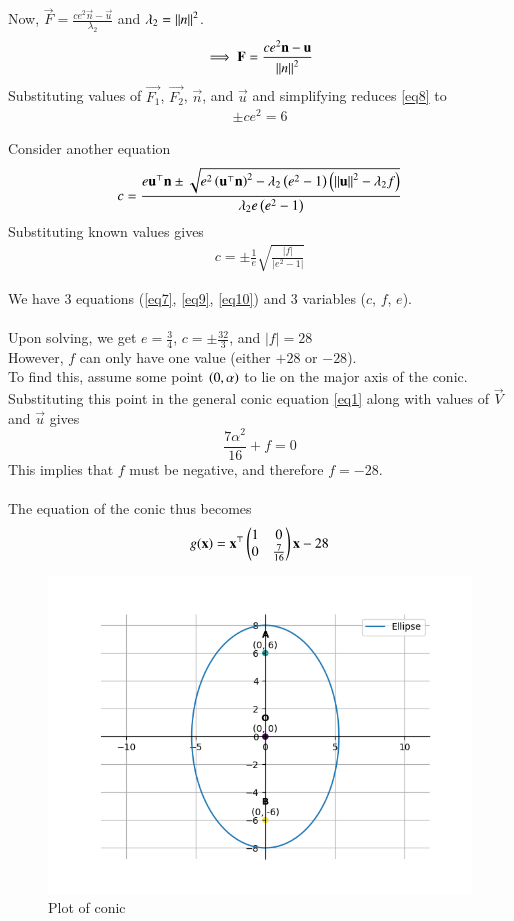 \documentclass[journal]{IEEEtran}
\begin{document}
Now, $\vec{F}=\frac{ce^2\vec{n}-\vec{u}}{\lambda_2}$ and $\lambda_2=\left\lVert n\right\rVert^2$.
\\
\begin{align}
\implies\mathbf{F}=\frac{ce^2\mathbf{n}-\mathbf{u}}{\left\lVert n\right\rVert^2} \label{eq8}
\end{align}
Substituting values of $\vec{F_1}$, $\vec{F_2}$, $\vec{n}$, and $\vec{u}$ and simplifying reduces \eqref{eq8} to
\begin{align}
\pm ce^2=6 \label{eq9}
\end{align}

Consider another equation $$c=\frac{e\mathbf{u}^\top\mathbf{n}\pm\sqrt{e^2\left(\mathbf{u}^\top\mathbf{n}\right)^2-\lambda_2\left(e^2-1\right)\left(\left\lVert\mathbf{u}\right\rVert^2-\lambda_2f\right)}}{\lambda_2e\left(e^2-1\right)}$$
Substituting known values gives
\begin{align}
c=\pm\frac{1}{e}\sqrt{\frac{|f|}{|e^2-1|}} \label{eq10}
\end{align}

We have 3 equations (\eqref{eq7}, \eqref{eq9}, \eqref{eq10}) and 3 variables ($c$, $f$, $e$).
\\ \\
Upon solving, we get $e=\frac{3}{4}$, $c=\pm\frac{32}{3}$, and $|f|=28$
\\
However, $f$ can only have one value (either $+28$ or $-28$).
\\
To find this, assume some point $\left(0,\alpha\right)$ to lie on the major axis of the conic. Substituting this point in the general conic equation \eqref{eq1} along with values of $\vec{V}$ and $\vec{u}$ gives $$\frac{7\alpha^2}{16}+f=0$$
This implies that $f$ must be negative, and therefore $f=-28$.
\\ \\
The equation of the conic thus becomes $$g(\mathbf{x}) = \mathbf{x}^\top\begin{pmatrix}1&0\\0&\frac{7}{16}\end{pmatrix}\mathbf{x}-28$$

\begin{figure}[h]
	\centering
	\includegraphics[width=\columnwidth]{figs/fig.png}
	\caption{Plot of conic}
\end{figure}
\end{document}

